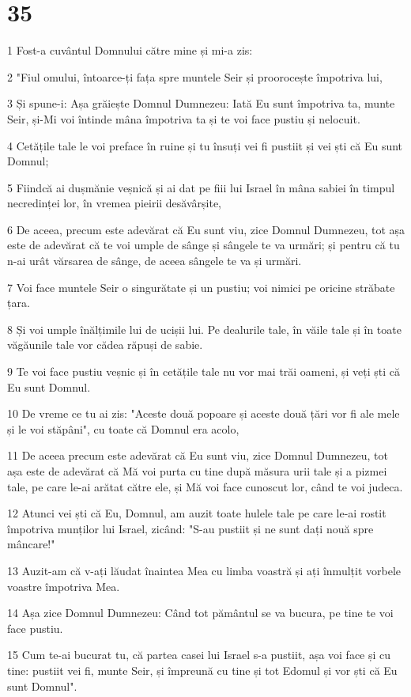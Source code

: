 \chapter{35}

\par 1 Fost-a cuvântul Domnului către mine și mi-a zis:
\par 2 "Fiul omului, întoarce-ți fața spre muntele Seir și proorocește împotriva lui,
\par 3 Și spune-i: Așa grăiește Domnul Dumnezeu: Iată Eu sunt împotriva ta, munte Seir, și-Mi voi întinde mâna împotriva ta și te voi face pustiu și nelocuit.
\par 4 Cetățile tale le voi preface în ruine și tu însuți vei fi pustiit și vei ști că Eu sunt Domnul;
\par 5 Fiindcă ai dușmănie veșnică și ai dat pe fiii lui Israel în mâna sabiei în timpul necredinței lor, în vremea pieirii desăvârșite,
\par 6 De aceea, precum este adevărat că Eu sunt viu, zice Domnul Dumnezeu, tot așa este de adevărat că te voi umple de sânge și sângele te va urmări; și pentru că tu n-ai urât vărsarea de sânge, de aceea sângele te va și urmări.
\par 7 Voi face muntele Seir o singurătate și un pustiu; voi nimici pe oricine străbate țara.
\par 8 Și voi umple înălțimile lui de ucișii lui. Pe dealurile tale, în văile tale și în toate văgăunile tale vor cădea răpuși de sabie.
\par 9 Te voi face pustiu veșnic și în cetățile tale nu vor mai trăi oameni, și veți ști că Eu sunt Domnul.
\par 10 De vreme ce tu ai zis: "Aceste două popoare și aceste două țări vor fi ale mele și le voi stăpâni", cu toate că Domnul era acolo,
\par 11 De aceea precum este adevărat că Eu sunt viu, zice Domnul Dumnezeu, tot așa este de adevărat că Mă voi purta cu tine după măsura urii tale și a pizmei tale, pe care le-ai arătat către ele, și Mă voi face cunoscut lor, când te voi judeca.
\par 12 Atunci vei ști că Eu, Domnul, am auzit toate hulele tale pe care le-ai rostit împotriva munților lui Israel, zicând: "S-au pustiit și ne sunt dați nouă spre mâncare!"
\par 13 Auzit-am că v-ați lăudat înaintea Mea cu limba voastră și ați înmulțit vorbele voastre împotriva Mea.
\par 14 Așa zice Domnul Dumnezeu: Când tot pământul se va bucura, pe tine te voi face pustiu.
\par 15 Cum te-ai bucurat tu, că partea casei lui Israel s-a pustiit, așa voi face și cu tine: pustiit vei fi, munte Seir, și împreună cu tine și tot Edomul și vor ști că Eu sunt Domnul".

